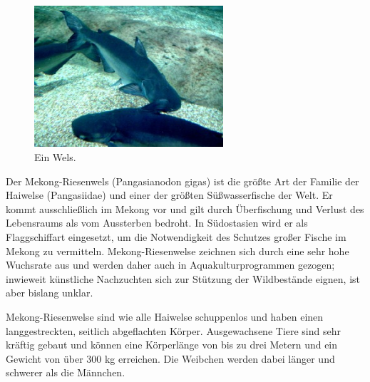 \documentclass[german, a4paper, 12pt]{scrartcl}
\begin{document}
\begin{figure}
	\includegraphics[width=7cm]{wels.jpg}
	\caption{Ein Wels.}
\end{figure}
\noindent Der Mekong-Riesenwels (Pangasianodon gigas) ist die größte Art der Familie der Haiwelse (Pangasiidae) und einer der größten Süßwasserfische der Welt. Er kommt ausschließlich im Mekong vor und gilt durch Überfischung und Verlust des Lebensraums als vom Aussterben bedroht. In Südostasien wird er als Flaggschiffart eingesetzt, um die Notwendigkeit des Schutzes großer Fische im Mekong zu vermitteln. Mekong-Riesenwelse zeichnen sich durch eine sehr hohe Wuchsrate aus und werden daher auch in Aquakulturprogrammen gezogen; inwieweit künstliche Nachzuchten sich zur Stützung der Wildbestände eignen, ist aber bislang unklar.

Mekong-Riesenwelse sind wie alle Haiwelse schuppenlos und haben einen langgestreckten, seitlich abgeflachten Körper. Ausgewachsene Tiere sind sehr kräftig gebaut und können eine Körperlänge von bis zu drei Metern und ein Gewicht von über 300 kg erreichen. Die Weibchen werden dabei länger und schwerer als die Männchen.
\end{document}
